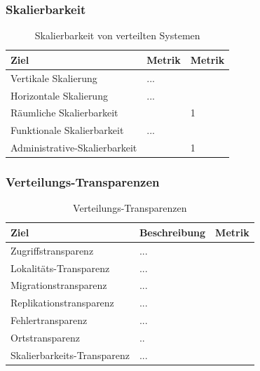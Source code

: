 \subsubsection{Skalierbarkeit}
    \begin{table}[h!]
            \centering
            \begin{tabular}{p{4cm}|p{5cm}|p{5cm}|}
                \hline
                \textbf{Ziel} & \textbf{Metrik} & \textbf{Metrik} \\
                \hline
                Vertikale Skalierung   & ... &\\
                \hline
                Horizontale Skalierung & ...& \\
                \hline
                Räumliche Skalierbarkeit &  & 1 \\
                \hline
                Funktionale Skalierbarkeit & ... & \\
                \hline
                Administrative-Skalierbarkeit & &1 \\
                \hline
            \end{tabular}
            \caption{Skalierbarkeit von verteilten Systemen}
            \label{tab:skalierbarkeit}
        \end{table}
    
\newpage
\subsubsection{Verteilungs-Transparenzen}
    \begin{table}[h!]
            \centering
            \begin{tabular}{p{4cm}|p{5cm}|p{5cm}|}
                \hline
                \textbf{Ziel} & \textbf{Beschreibung} & \textbf{Metrik} \\
                \hline
                Zugriffstransparenz   & ...&\\
                \hline
                Lokalitäts-Transparenz  & ...&\\
                \hline
                Migrationstransparenz & ...&\\
                \hline
                Replikationstransparenz &...&\\
                \hline
                Fehlertransparenz &... &\\
                \hline
                Ortstransparenz & .. &\\
                \hline
                Skalierbarkeits-Transparenz & ... & \\
                \hline
            \end{tabular}
            \caption{Verteilungs-Transparenzen}
            \label{tab:transparenzen}
        \end{table}
        



